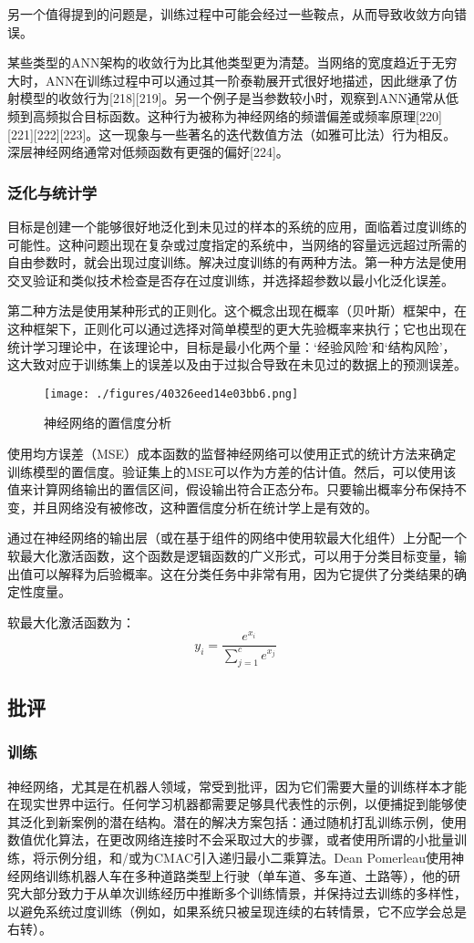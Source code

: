 另一个值得提到的问题是，训练过程中可能会经过一些鞍点，从而导致收敛方向错误。

某些类型的ANN架构的收敛行为比其他类型更为清楚。当网络的宽度趋近于无穷大时，ANN在训练过程中可以通过其一阶泰勒展开式很好地描述，因此继承了仿射模型的收敛行为[218][219]。另一个例子是当参数较小时，观察到ANN通常从低频到高频拟合目标函数。这种行为被称为神经网络的频谱偏差或频率原理[220][221][222][223]。这一现象与一些著名的迭代数值方法（如雅可比法）行为相反。深层神经网络通常对低频函数有更强的偏好[224]。
\subsubsection{泛化与统计学}
目标是创建一个能够很好地泛化到未见过的样本的系统的应用，面临着过度训练的可能性。这种问题出现在复杂或过度指定的系统中，当网络的容量远远超过所需的自由参数时，就会出现过度训练。解决过度训练的有两种方法。第一种方法是使用交叉验证和类似技术检查是否存在过度训练，并选择超参数以最小化泛化误差。

第二种方法是使用某种形式的正则化。这个概念出现在概率（贝叶斯）框架中，在这种框架下，正则化可以通过选择对简单模型的更大先验概率来执行；它也出现在统计学习理论中，在该理论中，目标是最小化两个量：‘经验风险’和‘结构风险’，这大致对应于训练集上的误差以及由于过拟合导致在未见过的数据上的预测误差。
\begin{figure}[ht]
\centering
\texttt{[image: ./figures/40326eed14e03bb6.png]}
\caption{神经网络的置信度分析} \label{fig_RGSJ_4}
\end{figure}
使用均方误差（MSE）成本函数的监督神经网络可以使用正式的统计方法来确定训练模型的置信度。验证集上的MSE可以作为方差的估计值。然后，可以使用该值来计算网络输出的置信区间，假设输出符合正态分布。只要输出概率分布保持不变，并且网络没有被修改，这种置信度分析在统计学上是有效的。

通过在神经网络的输出层（或在基于组件的网络中使用软最大化组件）上分配一个软最大化激活函数，这个函数是逻辑函数的广义形式，可以用于分类目标变量，输出值可以解释为后验概率。这在分类任务中非常有用，因为它提供了分类结果的确定性度量。

软最大化激活函数为：
\[
y_i = \frac{e^{x_i}}{\sum_{j=1}^{c} e^{x_j}}~
\]
\subsection{批评}
\subsubsection{训练}
神经网络，尤其是在机器人领域，常受到批评，因为它们需要大量的训练样本才能在现实世界中运行。任何学习机器都需要足够具代表性的示例，以便捕捉到能够使其泛化到新案例的潜在结构。潜在的解决方案包括：通过随机打乱训练示例，使用数值优化算法，在更改网络连接时不会采取过大的步骤，或者使用所谓的小批量训练，将示例分组，和/或为CMAC引入递归最小二乘算法。Dean Pomerleau使用神经网络训练机器人车在多种道路类型上行驶（单车道、多车道、土路等），他的研究大部分致力于从单次训练经历中推断多个训练情景，并保持过去训练的多样性，以避免系统过度训练（例如，如果系统只被呈现连续的右转情景，它不应学会总是右转）。